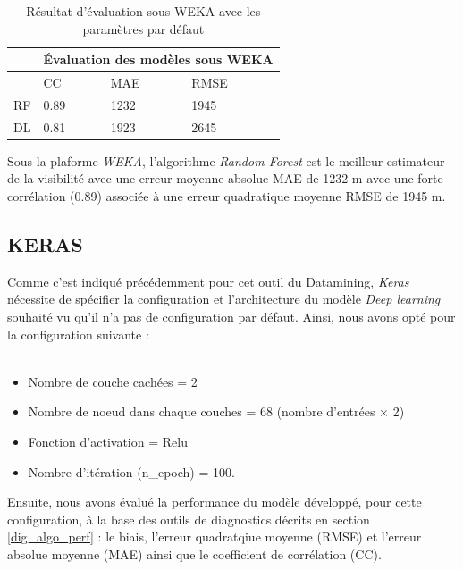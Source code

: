 \begin{table}[!ht]
    \centering
    \begin{tabular}{ |c|p{2cm}|p{2cm}|p{2cm}|  }
     \hline
     & \multicolumn{3}{|c|}{Évaluation des modèles sous WEKA} \\
     \hline
     & CC & MAE & RMSE\\
     \hline
     RF & 0.89  &  1232 & 1945 \\
     \hline
     DL & 0.81  & 1923 & 2645 \\
    \hline
    \end{tabular}
    \caption{Résultat d'évaluation sous WEKA avec les paramètres par défaut}
    \label{weka_default}
\end{table}

 Sous la plaforme \textit{WEKA}, l'algorithme \textit{Random Forest} est le meilleur estimateur de la visibilité avec une erreur moyenne absolue MAE de 1232 m avec une forte corrélation (0.89) associée à une erreur quadratique moyenne RMSE de 1945 m.

\subsection*{KERAS}
Comme c'est indiqué précédemment pour cet outil du Datamining, \textit{Keras} nécessite de spécifier la configuration et l'architecture du modèle \textit{Deep learning} souhaité vu qu'il n'a pas de configuration par défaut. Ainsi, nous avons opté pour la configuration suivante : \\
\\

\begin{itemize}
    \item[\ding{224}] Nombre de couche cachées = 2
    \item[\ding{224}] Nombre de noeud dans chaque couches = 68 (nombre d'entrées $\times$ 2)
    \item[\ding{224}] Fonction d'activation = Relu
    \item[\ding{224}] Nombre d'itération (n\_epoch) = 100.\\
\end{itemize}

Ensuite, nous avons évalué la performance du modèle développé, pour cette configuration, à la base des outils de diagnostics décrits en section \ref{dig_algo_perf} : le biais, l'erreur quadratqiue moyenne (RMSE) et l'erreur absolue moyenne (MAE) ainsi que le coefficient de corrélation (CC).\\ 

